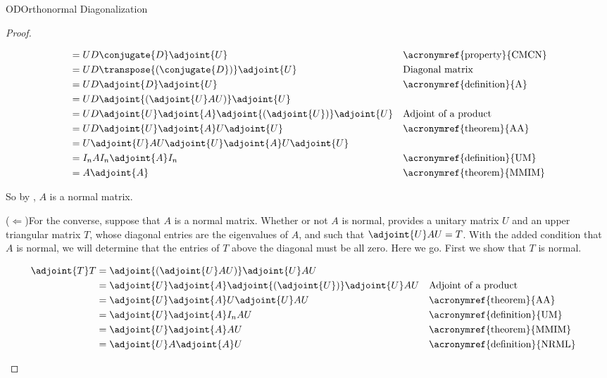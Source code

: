 \begin{subsect}{OD}{Orthonormal Diagonalization}
\begin{proof}
\begin{para}
\begin{align*}
&=U  D    \conjugate{D}    \adjoint{U}&&\text{\acronymref{property}{CMCN}}\\
&=U  D    \transpose{\left(\conjugate{D}\right)}    \adjoint{U}&&\text{Diagonal matrix}\\
&=U  D    \adjoint{D}    \adjoint{U}&&\text{\acronymref{definition}{A}}\\
&=U  D    \adjoint{\left(\adjoint{U}AU\right)}    \adjoint{U}\\
&=U  D    \adjoint{U}\adjoint{A}\adjoint{\left(\adjoint{U}\right)}    \adjoint{U}&&\text{Adjoint of a product}\\
&=U  D    \adjoint{U}\adjoint{A}U    \adjoint{U}&&\text{\acronymref{theorem}{AA}}\\
&=U  \adjoint{U}AU    \adjoint{U}\adjoint{A}U    \adjoint{U}\\
&=I_n A I_n \adjoint{A} I_n&&\text{\acronymref{definition}{UM}}\\
&=A\adjoint{A}&&\text{\acronymref{theorem}{MMIM}}
\end{align*}
\end{para}
%
\begin{para}So by , $A$ is a normal matrix.\end{para}
%
\begin{para}($\Leftarrow$)\quad For the converse, suppose that $A$ is a normal matrix.   Whether or not $A$ is normal,  provides a unitary matrix $U$ and an upper triangular matrix $T$, whose diagonal entries are the eigenvalues of $A$, and such that $\adjoint{U}AU=T$.  With the added condition that $A$ is normal, we will determine that the entries of $T$ above the diagonal must be all zero.  Here we go.  First we show that $T$ is normal.\end{para}
%
\begin{para}
\begin{align*}
\adjoint{T}T
&=\adjoint{\left(\adjoint{U}AU\right)}\adjoint{U}AU\\
&=\adjoint{U}\adjoint{A}\adjoint{\left(\adjoint{U}\right)}\adjoint{U}AU&&\text{Adjoint of a product}\\
&=\adjoint{U}\adjoint{A}U\adjoint{U}AU&&\text{\acronymref{theorem}{AA}}\\
&=\adjoint{U}\adjoint{A}I_nAU&&\text{\acronymref{definition}{UM}}\\
&=\adjoint{U}\adjoint{A}AU&&\text{\acronymref{theorem}{MMIM}}\\
&=\adjoint{U}A\adjoint{A}U&&\text{\acronymref{definition}{NRML}}\\

\end{align*}
\end{para}
\end{proof}
\end{subsect}
